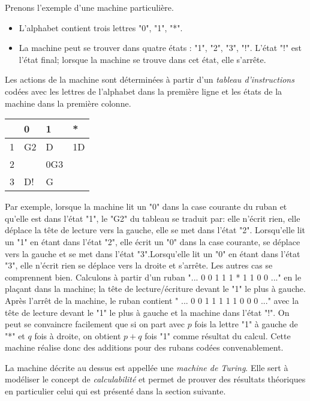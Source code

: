 Prenons l'exemple d'une machine particulière.
\begin{itemize}
  \item L'alphabet contient trois lettres "0", "1", "*".
  \item La machine peut se trouver dans quatre états : "1", "2", "3", "!". L'état "!" est l'état final; lorsque la machine se trouve dans cet état, elle s'arrête. 
\end{itemize}
Les actions de la machine sont déterminées à partir d'un \emph{tableau d'instructions} codées avec les lettres de l'alphabet dans la première ligne et les états de la machine dans la première colonne.
\begin{center}
\renewcommand{\arraystretch}{1.5}
\begin{tabular}{|l|l|l|l|} \hline
  & 0  & 1   & *  \\ \hline
1 & G2 & D   & 1D \\ \hline
2 &    & 0G3 &    \\ \hline
3 & D! & G   &    \\ \hline
\end{tabular}
\end{center}
Par exemple, lorsque la machine lit un "0" dans la case courante du ruban et qu'elle est dans l'état "1", le "G2" du tableau se traduit par: elle n'écrit rien, elle déplace la tête de lecture vers la gauche, elle se met dans l'état "2".\newline
Lorsqu'elle lit un "1" en étant dans l'état "2", elle écrit un "0" dans la case courante, se déplace vers la gauche et se met dans l'état "3".\newline Lorsqu'elle lit un "0" en étant dans l'état "3", elle n'écrit rien se déplace vers la droite et s'arrête. Les autres cas se comprennent bien.\newline
Calculons à partir d'un ruban "... 0 0 1 1 1 * 1 1 0 0 ..." en le plaçant dans la machine; la tête de lecture/écriture devant le "1" le plus à gauche.\newline
Après l'arrêt de la machine, le ruban contient " ... 0 0 1 1 1 1 1 0 0 0 ..." avec la tête de lecture devant le "1" le plus à gauche et la machine dans l'état "!".\newline
On peut se convaincre facilement que si on part avec $p$ fois la lettre "1" à gauche de "*" et $q$ fois à droite, on obtient $p+q$ fois "1" comme résultat du calcul. Cette machine réalise donc des additions pour des rubans codées convenablement.

La machine décrite au dessus est appellée une \emph{machine de Turing}. Elle sert à modéliser le concept de \emph{calculabilité} et permet de prouver des résultats théoriques en particulier celui qui est présenté dans la section suivante.

